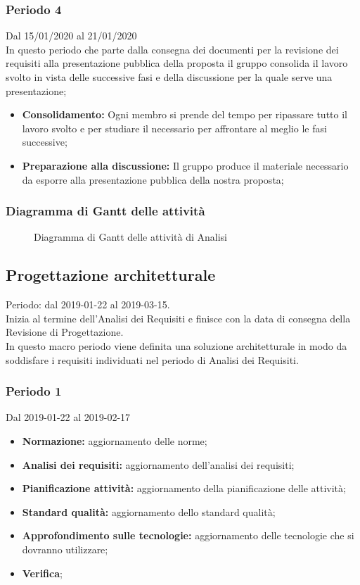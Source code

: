 \subsubsection{Periodo 4} 
Dal 15/01/2020 al 21/01/2020\\
In questo periodo che parte dalla consegna dei documenti per la revisione dei requisiti alla presentazione pubblica della proposta il gruppo consolida il lavoro svolto in vista delle successive fasi e della discussione per la quale serve una presentazione;
\begin{itemize}
	\item \textbf{Consolidamento:} Ogni membro si prende del tempo per ripassare tutto il lavoro svolto e per studiare il necessario per affrontare al meglio le fasi successive;
	\item \textbf{Preparazione alla discussione:} Il gruppo produce il materiale necessario da esporre alla presentazione pubblica della nostra proposta;
\end{itemize}
\subsubsection{Diagramma di Gantt delle attività}
\begin{figure}[h]
	\caption{Diagramma di Gantt delle attività di Analisi}
\end{figure}


\subsection{Progettazione architetturale}
Periodo: dal 2019-01-22 al 2019-03-15.
\\Inizia al termine dell'Analisi dei Requisiti e finisce con la data di consegna della Revisione di Progettazione.
\\In questo macro periodo viene definita una soluzione architetturale in modo da soddisfare i requisiti individuati nel periodo di Analisi dei Requisiti.

\subsubsection{Periodo 1} 
Dal 2019-01-22 al 2019-02-17
\begin{itemize}
	\item \textbf{Normazione:} aggiornamento delle norme;
	\item \textbf{Analisi dei requisiti:} aggiornamento dell'analisi dei requisiti;
	\item \textbf{Pianificazione attività:} aggiornamento della pianificazione delle attività;
	\item \textbf{Standard qualità:} aggiornamento dello standard qualità;
	\item \textbf{Approfondimento sulle tecnologie:} aggiornamento delle tecnologie che si dovranno utilizzare;
	\item \textbf{Verifica};
\end{itemize}
